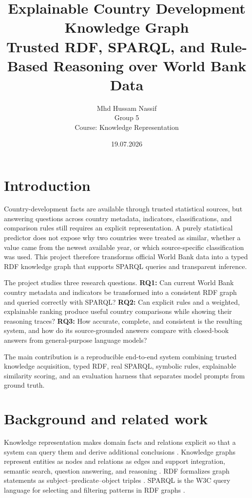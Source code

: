 \documentclass[12pt,a4paper]{article}
\title{Explainable Country Development Knowledge Graph\\
Trusted RDF, SPARQL, and Rule-Based Reasoning over World Bank Data}
\author{Mhd Hussam Nassif\\Group 5\\Course: Knowledge Representation}
\date{19.07.2026}
\begin{document}
\maketitle

\section*{Introduction}
Country-development facts are available through trusted statistical sources, but answering questions across country metadata, indicators, classifications, and comparison rules still requires an explicit representation. A purely statistical predictor does not expose why two countries were treated as similar, whether a value came from the newest available year, or which source-specific classification was used. This project therefore transforms official World Bank data into a typed RDF knowledge graph that supports SPARQL queries and transparent inference.

The project studies three research questions. \textbf{RQ1:} Can current World Bank country metadata and indicators be transformed into a consistent RDF graph and queried correctly with SPARQL? \textbf{RQ2:} Can explicit rules and a weighted, explainable ranking produce useful country comparisons while showing their reasoning traces? \textbf{RQ3:} How accurate, complete, and consistent is the resulting system, and how do its source-grounded answers compare with closed-book answers from general-purpose language models?

The main contribution is a reproducible end-to-end system combining trusted knowledge acquisition, typed RDF, real SPARQL, symbolic rules, explainable similarity scoring, and an evaluation harness that separates model prompts from ground truth.

\section*{Background and related work}
Knowledge representation makes domain facts and relations explicit so that a system can query them and derive additional conclusions \citep{brachman2004knowledge}. Knowledge graphs represent entities as nodes and relations as edges and support integration, semantic search, question answering, and reasoning \citep{hogan2021knowledgegraphs}. RDF formalizes graph statements as subject--predicate--object triples \citep{cyganiak2014rdf}. SPARQL is the W3C query language for selecting and filtering patterns in RDF graphs \citep{harris2013sparql}.
\end{document}
